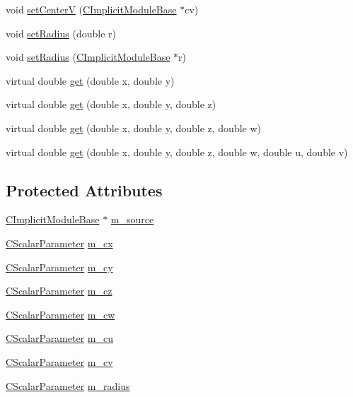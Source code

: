 \begin{DoxyCompactItemize}
\item 
void \hyperlink{classanl_1_1CImplicitSphere_abb950023259379f1384f14510e494631}{setCenterV} (\hyperlink{classanl_1_1CImplicitModuleBase}{CImplicitModuleBase} $\ast$cv)
\item 
void \hyperlink{classanl_1_1CImplicitSphere_a02412e8eeb89e7e799d2ca383398a1d5}{setRadius} (double r)
\item 
void \hyperlink{classanl_1_1CImplicitSphere_ae4b3a1cfdacf4bfb1aaa77a87eb887e8}{setRadius} (\hyperlink{classanl_1_1CImplicitModuleBase}{CImplicitModuleBase} $\ast$r)
\item 
virtual double \hyperlink{classanl_1_1CImplicitSphere_a215221f358be39ffc2fd09ffe77ca7bc}{get} (double x, double y)
\item 
virtual double \hyperlink{classanl_1_1CImplicitSphere_a8698af16bc095a14992560caf6be36c7}{get} (double x, double y, double z)
\item 
virtual double \hyperlink{classanl_1_1CImplicitSphere_a08193959ed4c6390025032da175f90ec}{get} (double x, double y, double z, double w)
\item 
virtual double \hyperlink{classanl_1_1CImplicitSphere_a7f6bae7c64d5ff6f0472aa497f216237}{get} (double x, double y, double z, double w, double u, double v)
\end{DoxyCompactItemize}
\subsection*{Protected Attributes}
\begin{DoxyCompactItemize}
\item 
\hyperlink{classanl_1_1CImplicitModuleBase}{CImplicitModuleBase} $\ast$ \hyperlink{classanl_1_1CImplicitSphere_a4ae09ba6643e92663518b46481798739}{m\_\-source}
\item 
\hyperlink{classanl_1_1CScalarParameter}{CScalarParameter} \hyperlink{classanl_1_1CImplicitSphere_a3c06195b4bab35ab7d4a3ed6090c526c}{m\_\-cx}
\item 
\hyperlink{classanl_1_1CScalarParameter}{CScalarParameter} \hyperlink{classanl_1_1CImplicitSphere_a56d0ab69129b8d44b1af96c2215aa8fb}{m\_\-cy}
\item 
\hyperlink{classanl_1_1CScalarParameter}{CScalarParameter} \hyperlink{classanl_1_1CImplicitSphere_aeb817b0ddc562a6703ef9d885b73ad9f}{m\_\-cz}
\item 
\hyperlink{classanl_1_1CScalarParameter}{CScalarParameter} \hyperlink{classanl_1_1CImplicitSphere_afef73aed6144204a4a7c4254664b929c}{m\_\-cw}
\item 
\hyperlink{classanl_1_1CScalarParameter}{CScalarParameter} \hyperlink{classanl_1_1CImplicitSphere_a5fd9fb4ef67bde5265ee17b39ef61899}{m\_\-cu}
\item 
\hyperlink{classanl_1_1CScalarParameter}{CScalarParameter} \hyperlink{classanl_1_1CImplicitSphere_a08460dc1823b374bf63261f73d66a890}{m\_\-cv}
\item 
\hyperlink{classanl_1_1CScalarParameter}{CScalarParameter} \hyperlink{classanl_1_1CImplicitSphere_a63eb786dc3193af282d77701a44b6d0e}{m\_\-radius}
\end{DoxyCompactItemize}


